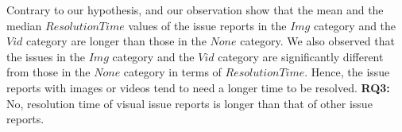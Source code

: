 Contrary to our hypothesis,  and our observation show that 
the mean and the median $ResolutionTime$ values of 
the issue reports in the $Img$ category and the $Vid$ category are 
longer than those in the $None$ category. 
We also observed that the issues in the $Img$ category and 
the $Vid$ category are significantly different from those 
in the $None$ category in terms of $ResolutionTime$.
Hence, the issue reports with images or videos tend to need 
a longer time to be resolved. 
\vspace{-0.2cm}%
\summarybox
{{\bf RQ3: }{No, resolution time of visual issue reports is longer than that of other issue reports.
}}




